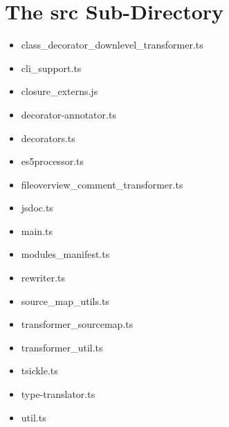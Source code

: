 \section{The src Sub-Directory}


\begin{itemize}
  \item class\_decorator\_downlevel\_transformer.ts
  \item cli\_support.ts
  \item closure\_externs.js
  \item decorator-annotator.ts
  \item decorators.ts
  \item es5processor.ts
  \item fileoverview\_comment\_transformer.ts
  \item jsdoc.ts
  \item main.ts
  \item modules\_manifest.ts
  \item rewriter.ts
  \item source\_map\_utils.ts
  \item transformer\_sourcemap.ts
  \item transformer\_util.ts
  \item tsickle.ts
  \item type-translator.ts
  \item util.ts
\end{itemize}







